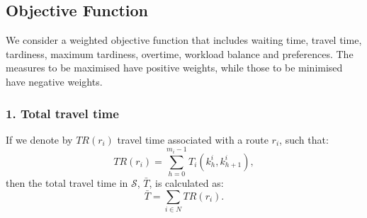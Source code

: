 \documentclass[a4paper,11pt,authoryear]{elsarticle}
\begin{document}



\subsection{Objective Function}
\label{sub:objectivefunc}
\noindent We consider a weighted objective function that includes waiting time, travel time, tardiness, maximum tardiness, overtime, workload balance and preferences. The measures to be maximised have positive weights, while those to be minimised have negative weights.

\subsubsection*{1. Total travel time}
\noindent If we denote by $TR(r_i)$ travel time associated with a route $r_i$, such that:
\begin{equation}
	TR(r_i) =  \sum_{h = 0}^{m_i - 1} T_i(k^i_h, k^i_{h + 1}), \label{eq:traveltimenurse}
\end{equation}
then the total travel time in $\mathcal{S}$, $\bar{T}$, is calculated as:
\begin{equation}
	\bar{T} = \sum_{i \in N}  TR(r_i). \label{eq:totaltraveltime}
\end{equation}
\end{document}
